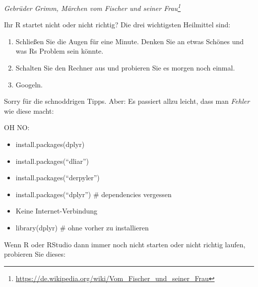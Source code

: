 \documentclass[12pt,ngerman,]{book}
\providecommand{\tightlist}{%
  \setlength{\itemsep}{0pt}\setlength{\parskip}{0pt}}
\let\rmarkdownfootnote\footnote%
\def\footnote{\protect\rmarkdownfootnote}
\theoremstyle{definition}
\theoremstyle{definition}
\theoremstyle{remark}
\let\BeginKnitrBlock\begin \let\EndKnitrBlock\end
\begin{document}
\emph{Gebrüder Grimm, Märchen vom Fischer und seiner Frau\footnote{\url{https://de.wikipedia.org/wiki/Vom_Fischer_und_seiner_Frau}}}

Ihr R startet nicht oder nicht richtig? Die drei wichtigsten Heilmittel
sind:

\begin{enumerate}
\def\labelenumi{\arabic{enumi}.}
\tightlist
\item
  Schließen Sie die Augen für eine Minute. Denken Sie an etwas Schönes
  und was Rs Problem sein könnte.
\item
  Schalten Sie den Rechner aus und probieren Sie es morgen noch einmal.
\item
  Googeln.
\end{enumerate}

Sorry für die schnoddrigen Tipps. Aber: Es passiert allzu leicht, dass
man \emph{Fehler} wie diese macht:

\BeginKnitrBlock{rmdcaution}
OH NO:

\begin{itemize}
\item
  install.packages(dplyr)
\item
  install.packages(``dliar'')
\item
  install.packages(``derpyler'')
\item
  install.packages(``dplyr'') \# dependencies vergessen
\item
  Keine Internet-Verbindung
\item
  library(dplyr) \# ohne vorher zu installieren
\end{itemize}
\EndKnitrBlock{rmdcaution}

Wenn R oder RStudio dann immer noch nicht starten oder nicht richtig
laufen, probieren Sie dieses:
\end{document}
